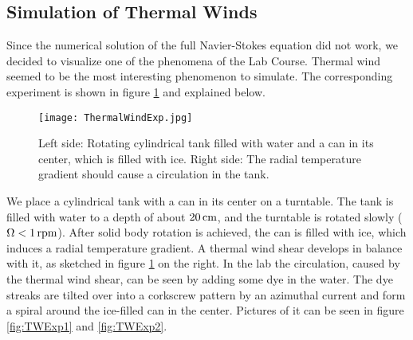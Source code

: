 \documentclass[12pt, a4paper]{article} %
\newcommand{\todoRef}{\todo[color=green!20]}
\begin{document}
	\subsection{Simulation of Thermal Winds}
		Since the numerical solution of the full Navier-Stokes equation did not work, we decided to visualize one of the phenomena of the Lab Course. Thermal wind seemed to be the most interesting phenomenon to simulate. The corresponding experiment is shown in figure \ref{fig:TWExperiment} and explained below.
		
		\begin{figure}[h]
			\centering
			\captionsetup{width=0.8\textwidth}
			\texttt{[image: ThermalWindExp.jpg]}
			\caption[Experiment Thermal Wind]{Left side: Rotating cylindrical tank filled with water and a can in its center, which is filled with ice. Right side: The radial temperature gradient should cause a circulation in the tank. \cite{Marshall1965}}
			\label{fig:TWExperiment}
		\end{figure}
		
		We place a cylindrical tank with a can in its center on a turntable. The tank is filled with water to a depth of about $\unit[20]{cm}$, and the turntable is rotated slowly ($\Omega < \unit[1]{rpm}$). After solid body rotation is achieved, the can is filled with ice, which induces a radial temperature gradient. A thermal wind shear develops in balance with it, as sketched in figure \ref{fig:TWExperiment} on the right.
		\newline
		In the lab the circulation, caused by the thermal wind shear, can be seen by adding some dye in the water. The dye streaks are tilted over into a corkscrew pattern by an azimuthal current and form a spiral around the ice-filled can in the center. Pictures of it can be seen in figure \ref{fig:TWExp1} and \ref{fig:TWExp2}.
		
		
\end{document}
